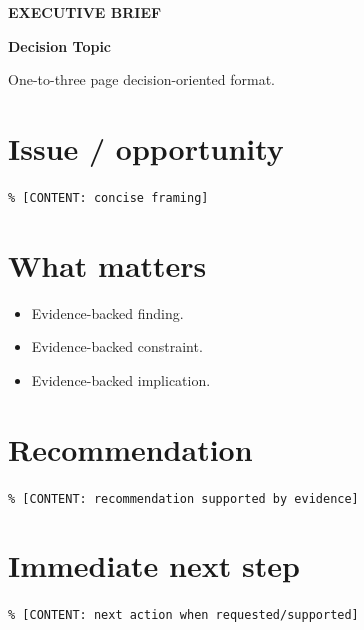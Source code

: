 \documentclass[11pt,a4paper]{scrartcl}
\newcommand{\brieflabel}[1]{\small\sffamily\bfseries\color{Accent}#1\par}
\begin{document}
\brieflabel{EXECUTIVE BRIEF}
{\Huge\bfseries Decision Topic\par}{\color{Muted} One-to-three page decision-oriented format.\par}
\section*{Issue / opportunity}\texttt{\% [CONTENT: concise framing]}
\section*{What matters}\begin{itemize}\item Evidence-backed finding.\item Evidence-backed constraint.\item Evidence-backed implication.\end{itemize}
\section*{Recommendation}\texttt{\% [CONTENT: recommendation supported by evidence]}
\section*{Immediate next step}\texttt{\% [CONTENT: next action when requested/supported]}
\end{document}
